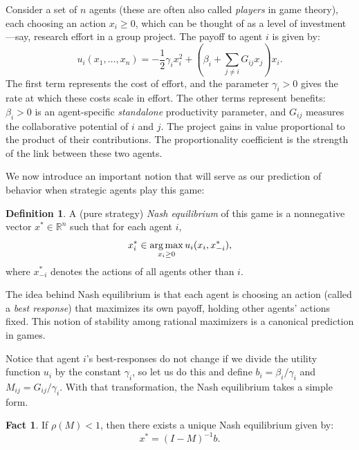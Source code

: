 \documentclass{notices}
\theoremstyle{definition}\newtheorem{problem}{Problem}
\theoremstyle{definition} \newtheorem{remark}{Remark}
\theoremstyle{definition} \newtheorem{claim}{Claim}
\newcommand{\argmax}{\operatornamewithlimits{arg \, max}}
\theoremstyle{definition} \newtheorem{thm}{Theorem}
\theoremstyle{definition} \newtheorem*{thmNoNum}{Theorem}
\theoremstyle{definition} \newtheorem{definition}{Definition}
\theoremstyle{definition} \theoremstyle{remark}
\theoremstyle{definition} \newtheorem{note}{Note}
\theoremstyle{definition} \newtheorem{notation}{Notation}
\theoremstyle{definition} \theoremstyle{plain}
\theoremstyle{definition} \newtheorem{condition}{Condition}
\theoremstyle{definition} \newtheorem{lem}{Lemma}
\theoremstyle{definition} \newtheorem{corollary}{Corollary}
\theoremstyle{definition} \newtheorem{prop}{Proposition}
\theoremstyle{definition} \newtheorem{ax}{Axiom}
\theoremstyle{definition} \newtheorem{assumption}{Assumption}
\theoremstyle{definition} \newtheorem{example}{Example}
\theoremstyle{definition} \newtheorem{rmk}{Remark}
\theoremstyle{definition} \newtheorem{res}{Result}
\theoremstyle{definition} \newtheorem{que}{Question}
\theoremstyle{definition} \newtheorem{conjecture}{Conjecture}
\newtheorem{fact}{Fact}
\theoremstyle{definition}
\begin{document}
Consider a set of $n$ agents (these are often also called \emph{players} in game theory), each choosing an action $x_i \geq 0$, which can be thought of as a level of investment—say, research effort in a group project. The payoff to agent $i$ is given by:
\begin{equation}
u_i(x_1, \ldots, x_n) = -\frac{1}{2} \gamma_i x_i^2 +  \left( \beta_i + \sum_{j \neq i} G_{ij} x_j \right)x_i.
\label{eq:network_game_payoff}
\end{equation}
The first term represents the cost of effort, and the parameter $\gamma_i>0$ gives the rate at which these costs scale in effort. The other terms represent benefits: $\beta_i > 0$ is an agent-specific \emph{standalone} productivity parameter, and $G_{ij}$ measures the collaborative potential of $i$ and $j$. The project gains in value proportional to the product of their contributions. The proportionality coefficient is the strength of the link between these two agents.

We now introduce an important notion that will serve as our prediction of behavior when strategic agents play this game:
\begin{definition}
A (pure strategy) \emph{Nash equilibrium} of this game is a nonnegative vector $x^* \in \mathbb{R}^n$ such that for each agent $i$,
$$
x_i^* \in \argmax_{x_i \geq 0} u_i(x_i, x_{-i}^*),
$$
where $x_{-i}^*$ denotes the actions of all agents other than $i$.
\end{definition}

The idea behind Nash equilibrium is that each agent is choosing an action (called a \emph{best response}) that maximizes its own payoff, holding other agents' actions fixed.  This notion of stability among rational maximizers is a canonical prediction in games.

Notice that agent $i$'s best-responses do not change if we divide the utility function $u_i$ by the constant $\gamma_i$, so let us do this and define $b_i = \beta_i/\gamma_i$ and $M_{ij} = G_{ij}/\gamma_i$. With that transformation, the Nash equilibrium takes a simple form.

\begin{fact} \label{fact:Nash}
If $\rho(M) < 1$, then there exists a unique Nash equilibrium given by:
\begin{equation} \label{eq:Nash}
x^* = (I - M)^{-1} b.
\end{equation}
\end{fact}
\end{document}
